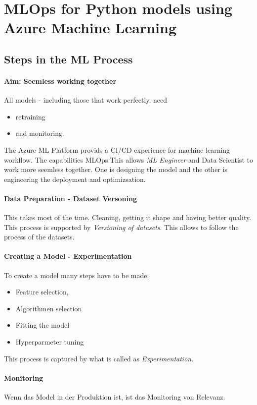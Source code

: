\section{MLOps for Python models using Azure Machine Learning}

\subsection{Steps in the ML Process}
\paragraph{Aim: Seemless working together}

All models - including those that work perfectly, need
\begin{itemize}
	\item retraining 
	\item and monitoring.
\end{itemize}
The Azure ML Platform provids a \gls{CI}/\gls{CD} experience for machine learning workflow. The capabilities \gls{MLOps}.This allows \textit{ML Engineer} and Data Scientist to work more seemless together. One is designing the model and the other is engineering the deployment and optimizsation.

\paragraph{Data Preparation - Dataset Versoning}
This takes most of the time. Cleaning, getting it shape and having better quality. This process is supported by \textit{Versioning of datasets}. This allows to follow the process of the datasets.

\paragraph{Creating a Model - Experimentation}
To create a model many steps have to be made:
\begin{itemize}
	\item Feature selection,
	\item Algorithmen selection
	\item Fitting the model
	\item Hyperparmeter tuning
\end{itemize}

This process is captured by what is called as \textit{Experimentation}.

\paragraph{Monitoring}
Wenn das Model in der Produktion ist, ist das Monitoring von Relevanz. 

